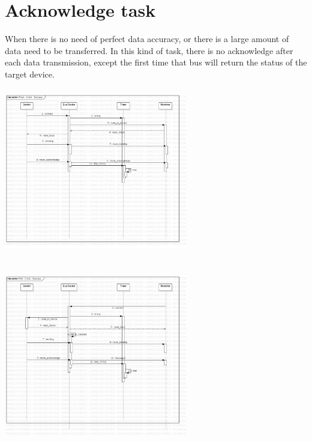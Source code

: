 \documentclass[12pt,article]{memoir}
\begin{document}
\section{Acknowledge task}
When there is no need of perfect data accuracy, or there is a large amount of data need to be transferred. In this kind of task, there is no acknowledge after each data transmission, except the first time that bus will return the status of the target device.\\
\includegraphics[width=8cm,height=8cm]{img/DR00012_Push_0_Ack_Success.jpg}
\includegraphics[width=8cm,height=8cm]{img/DR00012_Pull_0_Ack_Success.jpg}
\end{document}
